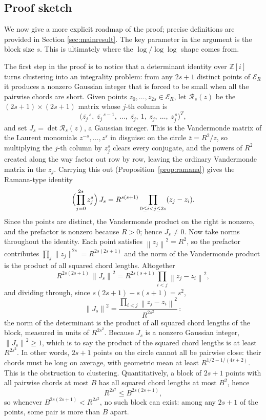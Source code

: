 \documentclass[11pt]{article}
\newcommand{\GI}{\mathbb Z[i]}
\newcommand{\Norm}[1]{\left\lVert#1\right\rVert^2}
\newcommand{\conj}[1]{\overline{#1}}
\newcommand{\E}{\mathcal E}
\begin{document}
\subsection{Proof sketch}
\label{subsec:proof-idea}

We now give a more explicit roadmap of the proof; precise definitions are provided in Section \ref{sec:mainresult}.
The key parameter in the argument is the block size $s$.
This is ultimately where the $\log / \log\log$ shape comes from. 


The first step in the proof is to notice that a determinant identity over \(\GI\) turns clustering into an integrality problem: from any \(2s+1\) distinct points of \(\E_R\) it produces a nonzero Gaussian integer that is forced to be small when all the pairwise chords are short.
Given points \(z_0,\dots,z_{2s}\in\E_R\), let \(\mathcal R_s(z)\) be the \((2s+1)\times(2s+1)\) matrix whose \(j\)-th column is
\[
  \bigl(\conj{z_j}^{\,s},\ \conj{z_j}^{\,s-1},\ \ldots,\ \conj{z_j},\ 1,\ z_j,\ \ldots,\ z_j^{\,s}\bigr)^T,
\]
and set \(J_s=\det\mathcal R_s(z)\), a Gaussian integer.
This is the Vandermonde matrix of the Laurent monomials \(z^{-s},\dots,z^s\) in disguise: on the circle \(\conj z=R^2/z\), so multiplying the \(j\)-th column by \(z_j^s\) clears every conjugate, and the powers of \(R^2\) created along the way factor out row by row, leaving the ordinary Vandermonde matrix in the \(z_j\).
Carrying this out (Proposition~\ref{prop:ramana}) gives the Ramana-type identity \cite{Ramana2007}
\[
  \Bigl(\prod_{j=0}^{2s} z_j^s\Bigr)\,J_s
  =
  R^{s(s+1)}\prod_{0\le i<j\le 2s}(z_j-z_i).
\]
Since the points are distinct, the Vandermonde product on the right is nonzero, and the prefactor is nonzero because \(R>0\); hence \(J_s\ne0\).
Now take norms throughout the identity.
Each point satisfies \(\Norm{z_j}=R^2\), so the prefactor contributes \(\prod_j\lVert z_j\rVert^{2s}=R^{2s(2s+1)}\) and the norm of the Vandermonde product is the product of all squared chord lengths.
Altogether
\[
  R^{2s(2s+1)}\,\Norm{J_s}
  =
  R^{2s(s+1)}\prod_{i<j}\Norm{z_j-z_i},
\]
and dividing through, since \(s(2s+1)-s(s+1)=s^2\),
\[
  \Norm{J_s} = \frac{\prod_{i<j} \Norm{z_j - z_i}}{R^{2s^2}}\,:
\]
the norm of the determinant is the product of all squared chord lengths of the block, measured in units of \(R^{2s^2}\).
Because \(J_s\) is a nonzero Gaussian integer, \(\Norm{J_s}\ge1\), which is to say the product of the squared chord lengths is at least \(R^{2s^2}\).
In other words, \(2s+1\) points on the circle cannot all be pairwise close: their chords must be long on average, with geometric mean at least \(R^{1/2-1/(4s+2)}\).
This is the obstruction to clustering.
Quantitatively, a block of \(2s+1\) points with all pairwise chords at most \(B\) has all squared chord lengths at most \(B^2\), hence
\[
  R^{2s^2}\le B^{2s(2s+1)},
\]
so whenever \(B^{2s(2s+1)}<R^{2s^2}\), no such block can exist: among any \(2s+1\) of the points, some pair is more than \(B\) apart.
\end{document}

